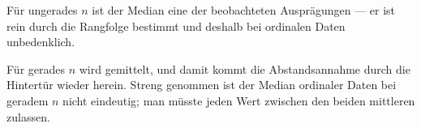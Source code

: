 \begin{warnung}
Für ungerades $n$ ist der Median eine der beobachteten Ausprägungen --- er ist rein durch die Rangfolge bestimmt und deshalb bei ordinalen Daten unbedenklich.

Für gerades $n$ wird gemittelt, und damit kommt die Abstandsannahme durch die Hintertür wieder herein. Streng genommen ist der Median ordinaler Daten bei geradem $n$ nicht eindeutig; man müsste jeden Wert zwischen den beiden mittleren zulassen.

\begin{center}
\begin{minipage}{0.88\textwidth}
\end{minipage}
\end{center}
\end{warnung}

